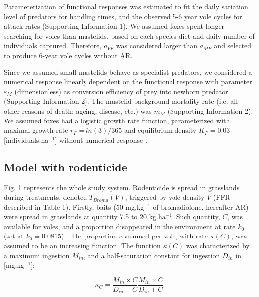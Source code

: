 \documentclass[11pt]{article}
\begin{document}
Parameterization of functional responses was estimated to fit the daily satiation level of predators for handling times, and the observed 5-6 year vole cycles for attack rates (Supporting Information 1). We assumed foxes spent longer searching for voles than mustelids, based on each species diet and daily number of individuals captured. Therefore, $a_{VF}$ was considered larger than $a_{MF}$ and selected to produce 6-year vole cycles without AR.


Since we assumed small mustelids behave as specialist predators, we considered a numerical response linearly dependent on the functional response with parameter $\varepsilon_M$ (dimensionless) as conversion efficiency of prey into newborn predator (Supporting Information 2). The mustelid background mortality rate (i.e. all other reasons of death: ageing, disease, etc.) was $m_M$ (Supporting Information 2). 
We assumed foxes had a logistic growth rate function, parameterized with maximal growth rate $r_F = ln(3)/365$ and equilibrium density $K_F = 0.03$ [individuals.ha$^{-1}$] \citep{Ruette2003} without numerical response \citep{Weber2002}. 

\subsection{Model with rodenticide}

Fig. 1 represents the whole study system. Rodenticide is spread in grasslands during treatments, denoted $T_{Broma}(V)$, triggered by vole density $V$ (FFR described in Table 1).
%
Firstly, baits (50 mg.kg$^{-1}$  of bromadiolone, hereafter AR) were spread in grasslands at quantity 7.5 to 20 kg.ha$^{-1}$.
%
Such quantity, $C$, was available for voles, and a proportion disappeared in the environment at rate $k_0$ (set at $k_0 = 0.0815$) \citep{Sage2008}. The proportion consumed per vole, with rate $\kappa(C)$, was assumed to be an increasing function. The function $\kappa(C)$ was characterized by a maximum ingestion $M_{in}$, and a half-saturation constant for ingestion $D_{in}$ in [mg.kg$^{-1}$]:

\begin{equation}
\kappa_C= \dfrac{M_{in}\times C}{D_{in} + C}\dfrac{M_{in} \times C}{D_{in} + C} 
\end{equation}
\end{document}
